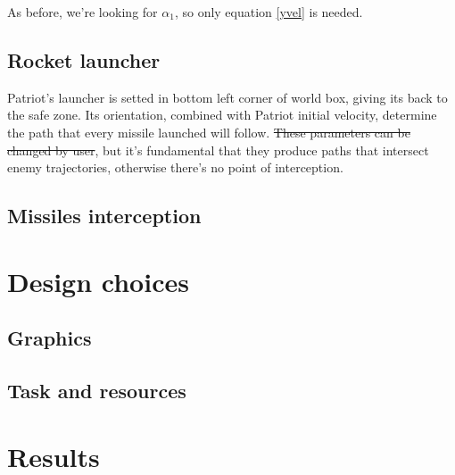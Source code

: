 \documentclass[notitlepage,a4paper,10pt]{article} %
\begin{document}
			As before, we're looking for $\alpha_1$, so only equation \ref{yvel} is needed.

	\subsection{Rocket launcher}

		Patriot's launcher is setted in bottom left corner of world box, giving its back to the safe zone.
		Its orientation, combined with Patriot initial velocity, determine the path that every missile launched will follow.
		\st{These parameters can be changed by user}, but it's fundamental that they produce paths that intersect enemy trajectories, otherwise there's no point of interception.

	\subsection{Missiles interception}
\section{Design choices}
	\subsection{Graphics}
	\subsection{Task and resources}
\section{Results}

\hypersetup{linkcolor=black}
\listoffigures %
\hypersetup{linkcolor=blue}
\end{document}
